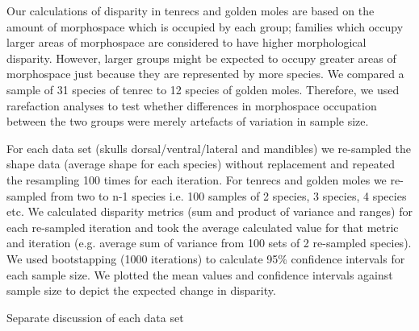 \documentclass[12pt,a4paper]{article}
\begin{document}
Our calculations of disparity in tenrecs and golden moles are based on the amount of morphospace which is occupied by each group; families which occupy larger areas of morphospace are considered to have higher morphological disparity. However, larger groups might be expected to occupy greater areas of morphospace just because they are represented by more species. We compared a sample of 31 species of tenrec to 12 species of golden moles. Therefore, we used rarefaction analyses to test whether differences in morphospace occupation between the two groups were merely artefacts of variation in sample size.

For each data set (skulls dorsal/ventral/lateral and mandibles) we re-sampled the shape data (average shape for each species) without replacement and repeated the resampling 100 times for each iteration. For tenrecs and golden moles we re-sampled from two to n-1 species i.e. 100 samples of 2 species, 3 species, 4 species etc. We calculated disparity metrics (sum and product of variance and ranges) for each re-sampled iteration and took the average calculated value for that metric and iteration (e.g. average sum of variance from 100 sets of 2 re-sampled species). We used bootstapping (1000 iterations) to calculate 95\% confidence intervals for each sample size. We plotted the mean values and confidence intervals against sample size to depict the expected change in disparity. 

Separate discussion of each data set
\end{document}
